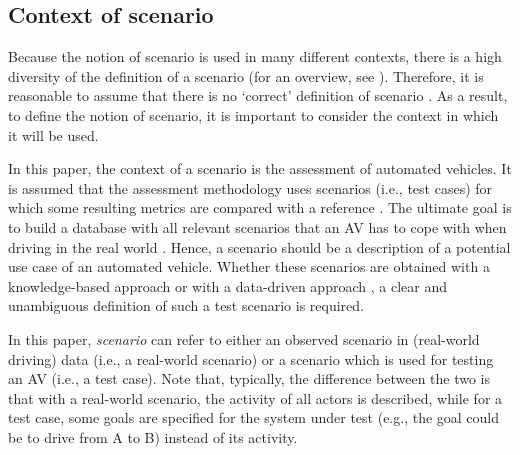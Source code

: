 \subsection{Context of scenario}
\label{sec:context}

Because the notion of scenario is used in many different contexts, there is a high diversity of the definition of a scenario (for an overview, see \cite{vannotten2003updated, bishop2007scentechniques}). Therefore, it is reasonable to assume that there is no `correct' definition of scenario \cite{vannotten2003updated}. As a result, to define the notion of scenario, it is important to consider the context in which it will be used.

In this paper, the context of a scenario is the assessment of automated vehicles. It is assumed that the assessment methodology uses scenarios (i.e., test cases) for which some resulting metrics are compared with a reference \cite{stellet2015taxonomy}. 
The ultimate goal is to build a database with all relevant scenarios that an AV has to cope with when driving in the real world \cite{putz2017pegasus}. Hence, a scenario should be a description of a potential use case of an automated vehicle. 
Whether these scenarios are obtained with a knowledge-based approach \cite{gietelink2004systemvalidation, stellet2015taxonomy} or with a data-driven approach \cite{deGelder2017assessment, stellet2015taxonomy}, a clear and unambiguous definition of such a test scenario is required. 

In this paper, \emph{scenario} can refer to either an observed scenario in (real-world driving) data (i.e., a real-world scenario) or a scenario which is used for testing an AV (i.e., a test case). Note that, typically, the difference between the two is that with a real-world scenario, the activity of all actors is described, while for a test case, some goals are specified for the system under test (e.g., the goal could be to drive from A to B) instead of its activity. 

